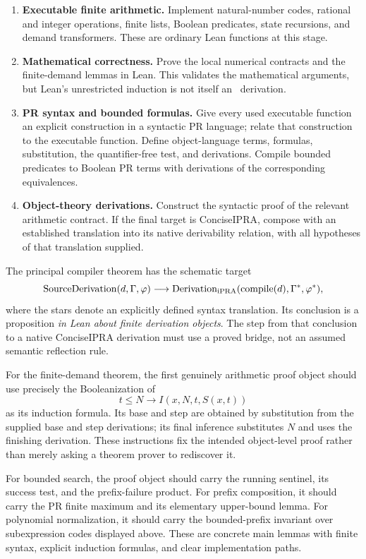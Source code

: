 \begin{enumerate}
\item \textbf{Executable finite arithmetic.}  Implement natural-number
codes, rational and integer operations, finite lists, Boolean predicates,
state recursions, and demand transformers.  These are ordinary Lean
functions at this stage.
\item \textbf{Mathematical correctness.}  Prove the local numerical
contracts and the finite-demand lemmas in Lean.  This validates the
mathematical arguments, but Lean's unrestricted induction is not itself an
\ipra\ derivation.
\item \textbf{PR syntax and bounded formulas.}  Give every used executable
function an explicit construction in a syntactic PR language; relate that
construction to the executable function.  Define object-language terms,
formulas, substitution, the quantifier-free test, and derivations.  Compile
bounded predicates to Boolean PR terms with derivations of the
corresponding equivalences.
\item \textbf{Object-theory derivations.}  Construct the syntactic proof of
the relevant arithmetic contract.  If the final target is ConciseIPRA,
compose with an established translation into its native derivability
relation, with all hypotheses of that translation supplied.
\end{enumerate}

The principal compiler theorem has the schematic target
\[
 \operatorname{SourceDerivation}(d,\Gamma,\varphi)
 \longrightarrow
 \operatorname{Derivation}_{\mathrm{iPRA}}
       (\operatorname{compile}(d),\Gamma^*,\varphi^*),
\]
where the stars denote an explicitly defined syntax translation.  Its
conclusion is a proposition \emph{in Lean about finite derivation objects}.
The step from that conclusion to a native ConciseIPRA derivation must use a
proved bridge, not an assumed semantic reflection rule.

For the finite-demand theorem, the first genuinely arithmetic proof object
should use precisely the Booleanization of
\[
 t\le N\to I(x,N,t,S(x,t))
\]
as its induction formula.  Its base and step are obtained by substitution
from the supplied base and step derivations; its final inference substitutes
$N$ and uses the finishing derivation.  These instructions fix the intended
object-level proof rather than merely asking a theorem prover to rediscover
it.

For bounded search, the proof object should carry the running sentinel,
its success test, and the prefix-failure product.  For prefix composition,
it should carry the PR finite maximum and its elementary upper-bound
lemma.  For polynomial normalization, it should carry the bounded-prefix
invariant over subexpression codes displayed above.  These are concrete
main lemmas with finite syntax, explicit induction formulas, and clear
implementation paths.

